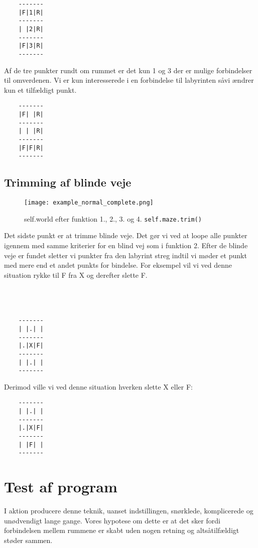 \documentclass[12pt]{article}
\begin{document}
\begin{verbatim}
	-------
	|F|1|R|
	-------
	| |2|R|
	-------
	|F|3|R|
	-------
\end{verbatim}

Af de tre punkter rundt om rummet er det kun 1 og 3 der er mulige forbindelser til omverdenen. Vi er kun interesserede i en forbindelse til labyrinten s\aa vi \ae ndrer kun et tilf\ae ldigt punkt.
\\
\begin{verbatim}
	-------
	|F| |R|
	-------
	| | |R|
	-------
	|F|F|R|
	-------
\end{verbatim}


\subsection{Trimming af blinde veje}

\begin{figure}[h]
	\centering
	\texttt{[image: example\_normal\_complete.png]}
	\caption{self.world efter funktion 1., 2., 3. og 4. \texttt{self.maze.trim()}}
\end{figure}

Det sidste punkt er at trimme blinde veje. Det g\o r vi ved at loope alle punkter igennem med samme kriterier for en blind vej som i funktion 2. Efter de blinde veje er fundet sletter vi punkter fra den labyrint streg indtil vi m\o der et punkt med mere end et andet punkts for bindelse. For eksempel vil vi ved denne situation rykke til F fra X og derefter slette F.
\\
\\
\\
\\
\begin{verbatim}
	-------
	| |.| |
	-------
	|.|X|F|
	-------
	| |.| |
	-------
\end{verbatim}

Derimod ville vi ved denne situation hverken slette X eller F:

\begin{verbatim}
	-------
	| |.| |
	-------
	|.|X|F|
	-------
	| |F| |
	-------
\end{verbatim}

\section{Test af program}

I aktion producere denne teknik, uanset indstillingen, sn\o rklede, komplicerede og un\o dvendigt lange gange. Vores hypotese om dette er at det sker fordi forbindelsen mellem rummene er skabt uden nogen retning og alts\aa tilf\ae ldigt st\o der sammen.
\end{document}
